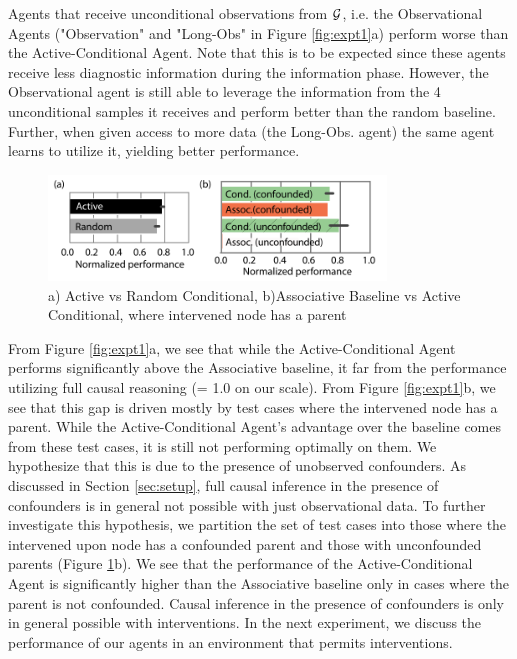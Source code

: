 Agents that receive unconditional observations from $\cal G$, i.e. the Observational Agents ("Observation" and "Long-Obs" in Figure \ref{fig:expt1}a) perform worse than the Active-Conditional Agent. Note that this is to be expected since these agents receive less diagnostic information during the information phase. However, the Observational agent is still able to leverage the information from the 4 unconditional samples it receives and perform better than the random baseline. Further, when given access to more data (the Long-Obs. agent) the same agent learns to utilize it, yielding better performance.

\begin{figure}[t!]
\centering
\includegraphics[width=0.8\textwidth, trim = {0 0cm 0 0.7cm}] {figures/fig2_conf_unconf_pars_act_pass_combined.pdf}
\caption{a) Active vs Random Conditional, b)Associative Baseline vs Active Conditional, where intervened node has a parent}
\label{fig:expt1_extra}
\end{figure}

From Figure \ref{fig:expt1}a, we see that while the Active-Conditional Agent performs significantly above the Associative baseline, it far from the performance utilizing full causal reasoning (= 1.0 on our scale). From Figure \ref{fig:expt1}b, we see that this gap is driven mostly by test cases where the intervened node has a parent. While the Active-Conditional Agent's advantage over the baseline comes from these test cases, it is still not performing optimally on them. We hypothesize that this is due to the presence of unobserved confounders. As discussed in Section \ref{sec:setup}, full causal inference in the presence of confounders is in general not possible with just observational data. 
To further investigate this hypothesis, we partition the set of test cases into those where the intervened upon node has a confounded parent and those with unconfounded parents (Figure \ref{fig:expt1_extra}b). We see that the performance of the Active-Conditional Agent is significantly higher than the Associative baseline only in cases where the parent is not confounded. Causal inference in the presence of confounders is only in general possible with interventions. In the next experiment, we discuss the performance of our agents in an environment that permits interventions.

